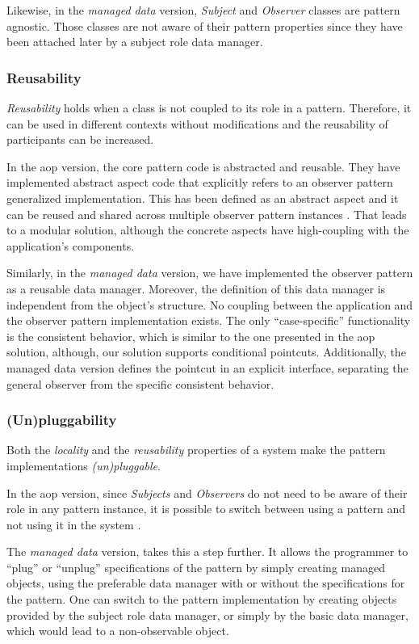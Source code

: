 Likewise, in the \textit{managed data} version, \textit{Subject} and \textit{Observer} classes are pattern agnostic.
Those classes are not aware of their pattern properties since they have been attached later by a subject role data manager.

\subsubsection{Reusability}
\textit{Reusability} holds when a class is not coupled to its role in a pattern.
Therefore, it can be used in different contexts without modifications and the reusability of participants can be increased.

In the \ac{aop} version, the core pattern code is abstracted and reusable. 
They have implemented abstract aspect code that explicitly refers to an observer pattern generalized implementation.
This has been defined as an abstract aspect and it can be reused and shared across multiple observer pattern instances \cite{hannemann2005role}.
That leads to a modular solution, although the concrete aspects have high-coupling with the application's components.

Similarly, in the \textit{managed data} version, we have implemented the observer pattern as a reusable data manager.
Moreover, the definition of this data manager is independent from the object's structure.
No coupling between the application and the observer pattern implementation exists.
The only ``case-specific'' functionality is the consistent behavior, which is similar to the one presented in the \ac{aop} solution, although, our solution supports conditional pointcuts.
Additionally, the managed data version defines the pointcut in an explicit interface, separating the general observer from the specific consistent behavior.

\subsubsection{(Un)pluggability}
Both the \textit{locality} and the \textit{reusability} properties of a system make the pattern implementations \textit{(un)pluggable}.

In the \ac{aop} version, since \textit{Subjects} and \textit{Observers} do not need to be aware of their role in any pattern instance, it is possible to switch between using a pattern and not using it in the system \cite{hannemann2005role}. 

The \textit{managed data} version, takes this a step further.
It allows the programmer to ``plug'' or ``unplug'' specifications of the pattern by simply creating managed objects, using the preferable data manager with or without the specifications for the pattern.
One can switch to the pattern implementation by creating objects provided by the subject role data manager, or simply by the basic data manager, which would lead to a non-observable object.

